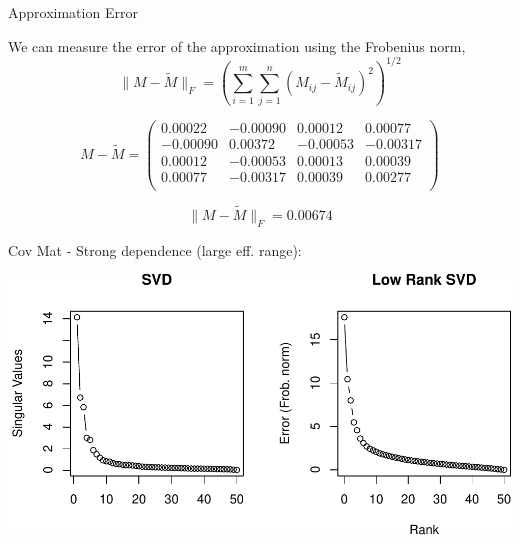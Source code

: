 \documentclass[11pt,ignorenonframetext,]{beamer}
\begin{document}
\begin{frame}{Approximation Error}
\protect\hypertarget{approximation-error}{}

We can measure the error of the approximation using the Frobenius norm,
\[ \lVert M-\tilde M\rVert_F = \left( \sum_{i=1}^m\sum_{j=1}^n (M_{ij}-\tilde M_{ij})^2\right)^{1/2} \]

\pause

\[  M-\tilde M = 
\begin{pmatrix}
  0.00022 & -0.00090 & 0.00012 & 0.00077 \\ 
  -0.00090 & 0.00372 & -0.00053 & -0.00317 \\ 
  0.00012 & -0.00053 & 0.00013 & 0.00039 \\ 
  0.00077 & -0.00317 & 0.00039 & 0.00277 \\ 
\end{pmatrix}
\]

\[ \lVert M-\tilde M\rVert_F = 0.00674 \]

\end{frame}

\begin{frame}{Cov Mat - Strong dependence (large eff. range):}
\protect\hypertarget{cov-mat---strong-dependence-large-eff.-range}{}

\begin{center}\includegraphics[width=\textwidth]{Lec21_files/figure-beamer/unnamed-chunk-9-1} \end{center}

\end{frame}
\end{document}
